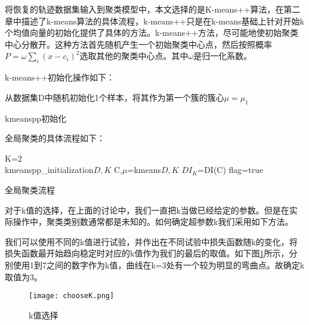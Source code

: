 将恢复的轨迹数据集输入到聚类模型中，本文选择的是K-means++算法，在第二章中描述了k-means算法的具体流程，k-means++只是在k-means基础上针对开始k个均值向量的初始化提供了具体的方法。k-means++方法，尽可能地使初始聚类中心分散开。这种方法首先随机产生一个初始聚类中心点，然后按照概率$P=\omega \sum_i{\left( x-c_i \right) ^2}$选取其他的聚类中心点。其中$\omega$是归一化系数。

k-means++初始化操作如下：\\
\begin{algorithm}[H]
	 从数据集D中随机初始化1个样本，将其作为第一个簇的簇心$\mu={\mu_1}$\;
	 \caption{kmeanspp初始化}
\end{algorithm}

全局聚类的具体流程如下：\\
\begin{algorithm}[H]
	\label{kmeanspp}
	 K=2\;\\
	 kmeanspp\_initialization\(D,K\)\;
	 C,$\mu$=kmeans\(D,K\)\;
	 $DI_K$=DI(C)\;
	 flag=true\;
	 \caption{全局聚类流程}
\end{algorithm}

对于k值的选择，在上面的讨论中，我们一直把k当做已经给定的参数。但是在实际操作中，聚类类别数通常都是未知的。如何确定超参数k我们采用如下方法。

我们可以使用不同的k值进行试验，并作出在不同试验中损失函数随k的变化，将损失函数最开始趋向稳定时对应的k值作为我们的最后的取值。如下图\ref{chooseK}所示，分别使用1到7之间的数字作为k值，曲线在k=3处有一个较为明显的弯曲点。故确定k取值为3。
\begin{figure}[H]
	\texttt{[image: chooseK.png]}
	\caption{k值选择}
	\label{chooseK}
\end{figure}

